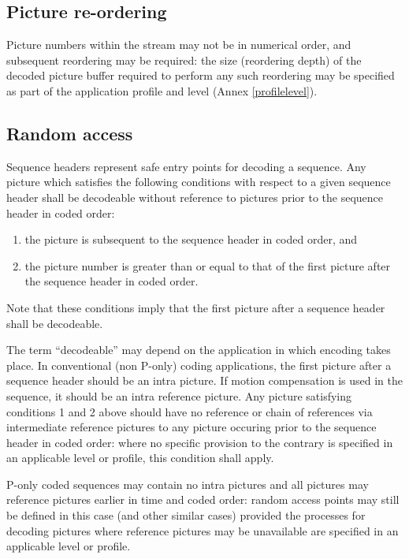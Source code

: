 \subsection{Picture re-ordering}
\label{picturereordering}
Picture numbers within the stream may not be in numerical order, and 
subsequent reordering may be required: the size (reordering depth) 
of the decoded picture buffer required to perform any such reordering may be 
specified as part of the application profile and level (Annex \ref{profilelevel}).
 
\subsection{Random access}
\label{randomaccess}
Sequence headers represent safe entry points for decoding a sequence. Any picture 
which satisfies the following conditions with respect to a given sequence header shall
be decodeable without reference to pictures prior to the sequence
header in coded order:
\begin{enumerate}
\item the picture is subsequent to the sequence header in coded order, and
\item the picture number is greater than or equal to that of the first picture after
the sequence header in coded order.
\end{enumerate}

Note that these conditions imply that the first picture after a sequence header shall
be decodeable. 

The term ``decodeable'' may depend on the application in
which encoding takes place. In conventional (non P-only) coding applications, the 
first picture after a sequence header should be an intra picture. If motion compensation 
is used in the sequence, it should be an intra reference picture. Any picture 
satisfying conditions 1 and 2 above should have no reference or chain of references 
via intermediate reference pictures to any picture occuring prior to the sequence 
header in coded order: where no specific provision to the contrary is specified in an
applicable level or profile, this condition shall apply.

P-only coded sequences may contain no intra pictures and all pictures may reference 
pictures earlier in time and coded order: random access points may still be defined 
in this case (and other similar cases) provided the processes for decoding pictures 
where reference pictures may be unavailable are specified in an applicable level or profile.

